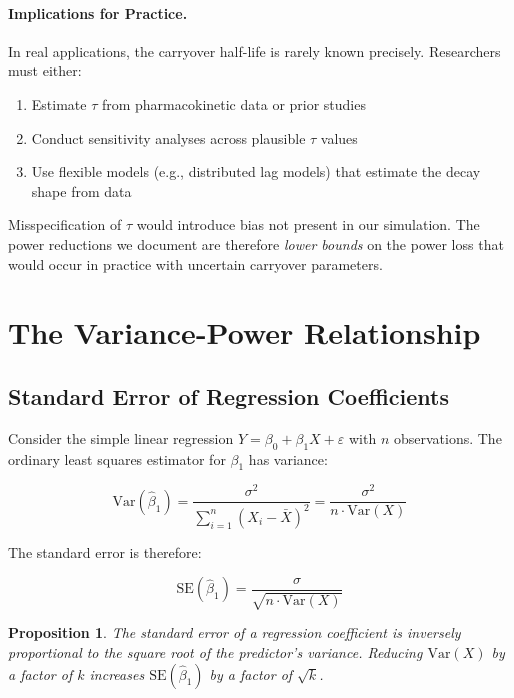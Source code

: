 \documentclass[11pt,letterpaper]{article}
\newtheorem{proposition}{Proposition}
\begin{document}
\paragraph{Implications for Practice.}
In real applications, the carryover half-life is rarely known precisely.
Researchers must either:
\begin{enumerate}
    \item Estimate $\tau$ from pharmacokinetic data or prior studies
    \item Conduct sensitivity analyses across plausible $\tau$ values
    \item Use flexible models (e.g., distributed lag models) that estimate the
          decay shape from data
\end{enumerate}

Misspecification of $\tau$ would introduce bias not present in our simulation.
The power reductions we document are therefore \emph{lower bounds} on the
power loss that would occur in practice with uncertain carryover parameters.

\section{The Variance-Power Relationship}

\subsection{Standard Error of Regression Coefficients}

Consider the simple linear regression $Y = \beta_0 + \beta_1 X + \varepsilon$
with $n$ observations. The ordinary least squares estimator for $\beta_1$ has
variance:

\begin{equation}
\text{Var}(\hat{\beta}_1) = \frac{\sigma^2}{\sum_{i=1}^{n}(X_i - \bar{X})^2}
                          = \frac{\sigma^2}{n \cdot \text{Var}(X)}
\label{eq:var_beta}
\end{equation}

The standard error is therefore:

\begin{equation}
\text{SE}(\hat{\beta}_1) = \frac{\sigma}{\sqrt{n \cdot \text{Var}(X)}}
\label{eq:se_beta}
\end{equation}

\begin{proposition}
The standard error of a regression coefficient is inversely proportional to
the square root of the predictor's variance. Reducing $\text{Var}(X)$ by a
factor of $k$ increases $\text{SE}(\hat{\beta}_1)$ by a factor of $\sqrt{k}$.
\end{proposition}
\end{document}
